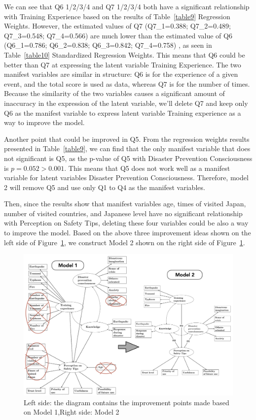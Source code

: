 We can see that Q6 1/2/3/4 and Q7 1/2/3/4 both have a significant relationship with Training Experience based on the results of Table~\ref{table9} Regression Weights. However, the estimated values of Q7 (Q7\_1=0.388; Q7\_2=0.489; Q7\_3=0.548; Q7\_4=0.566) are much lower than the estimated value of Q6 (Q6\_1=0.786; Q6\_2=0.838; Q6\_3=0.842; Q7\_4=0.758) , as seen in Table~\ref{table10} Standardized Regression Weights. This means that Q6 could be better than Q7 at expressing the latent variable Training Experience. The two manifest variables are similar in structure: Q6 is for the experience of a given event, and the total score is used as data, whereas Q7 is for the number of times. Because the similarity of the two variables causes a significant amount of inaccuracy in the expression of the latent variable, we'll delete Q7 and keep only Q6 as the manifest variable to express latent variable Training experience as a way to improve the model. 

Another point that could be improved in Q5. From the regression weights results presented in Table~\ref{table9}, we can find that the only manifest variable that does not significant is Q5, as the p-value of Q5 with Disaster Prevention Consciousness is $p=0.052>0.001$. This means that Q5 does not work well as a manifest variable for latent variables Disaster Prevention Consciousness. Therefore, model 2 will remove Q5 and use only Q1 to Q4 as the manifest variables.

Then, since the results show that manifest variables age, times of visited Japan, number of visited countries, and Japanese level have no significant relationship with Perception on Safety Tips, deleting these four variables could be also a way to improve the model. 
Based on the above three improvement ideas shown on the left side of Figure~\ref{fig25}, we construct Model 2 shown on the right side of Figure~\ref{fig25}.

\begin{figure}[t]
  \includegraphics[width=\linewidth]{Figure/Figure25.png}
  \centering
  \caption[SEM model 2]{Left side: the diagram contains the improvement points made based on Model 1,Right side: Model 2}
  \label{fig25}
\end{figure}


